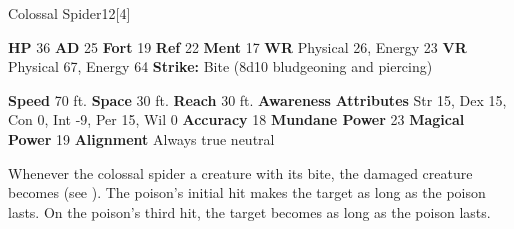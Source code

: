   \begin{monsubsection}{Colossal Spider}{12}[4]
    \vspace{-1em}\vspace{-1em}
    \vspace{0em}

    
    

    \begin{spellcontent}
      \begin{spelltargetinginfo}
        \pari \textbf{HP} 36 \monsep
          \textbf{AD} 25 \monsep
          \textbf{Fort} 19 \monsep
          \textbf{Ref} 22 \monsep
          \textbf{Ment} 17
        \pari \textbf{WR} Physical 26, Energy 23 \monsep
        \textbf{VR} Physical 67, Energy 64
        \pari \textbf{Strike:}
            Bite  (8d10 bludgeoning and piercing)
      \end{spelltargetinginfo}
    \end{spellcontent}
    \begin{monsterfooter}
      \pari \textbf{Speed} 70 ft. \monsep
        \textbf{Space} 30 ft. \monsep
        \textbf{Reach} 30 ft.
      \pari \textbf{Awareness} 
      \pari \textbf{Attributes}
        Str 15, Dex 15,
        Con 0, Int -9,
        Per 15, Wil 0
      \pari \textbf{Accuracy} 18 \monsep
        \textbf{Mundane Power} 23 \monsep
      \textbf{Magical Power} 19
      \pari \textbf{Alignment} Always true neutral
    \end{monsterfooter}
  \end{monsubsection}
        Whenever the colossal spider  a creature with its bite,
          the damaged creature becomes  (see ).
        The poison's initial hit makes the target  as long as the poison lasts.
        On the poison's third hit, the target becomes  as long as the poison lasts.
  
